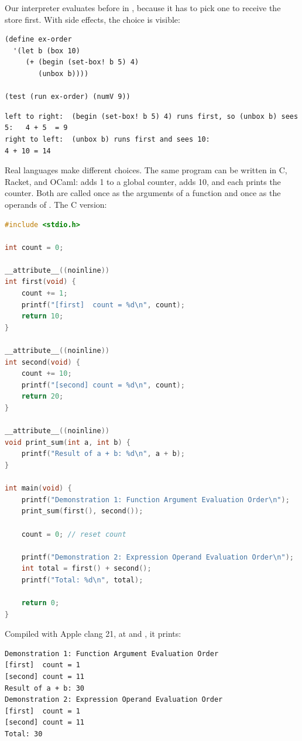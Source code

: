 Our interpreter evaluates  before  in , because it has to pick one to receive the store first. With side effects, the choice is visible:
\begin{lstlisting}
(define ex-order
  '(let b (box 10)
     (+ (begin (set-box! b 5) 4)
        (unbox b))))

(test (run ex-order) (numV 9))
\end{lstlisting}
\begin{lstlisting}[style=repl]
left to right:  (begin (set-box! b 5) 4) runs first, so (unbox b) sees 5:   4 + 5  = 9
right to left:  (unbox b) runs first and sees 10:                           4 + 10 = 14
\end{lstlisting}
Real languages make different choices. The same program can be written in C, Racket, and OCaml:  adds 1 to a global counter,  adds 10, and each prints the counter. Both are called once as the arguments of a function and once as the operands of \code{+}. The C version:
\begin{lstlisting}[language=C]
#include <stdio.h>

int count = 0;

__attribute__((noinline))
int first(void) {
    count += 1;
    printf("[first]  count = %d\n", count);
    return 10;
}

__attribute__((noinline))
int second(void) {
    count += 10;
    printf("[second] count = %d\n", count);
    return 20;
}

__attribute__((noinline))
void print_sum(int a, int b) {
    printf("Result of a + b: %d\n", a + b);
}

int main(void) {
    printf("Demonstration 1: Function Argument Evaluation Order\n");
    print_sum(first(), second());

    count = 0; // reset count

    printf("Demonstration 2: Expression Operand Evaluation Order\n");
    int total = first() + second();
    printf("Total: %d\n", total);

    return 0;
}
\end{lstlisting}
Compiled with Apple clang 21, at  and , it prints:
\begin{lstlisting}[style=repl]
Demonstration 1: Function Argument Evaluation Order
[first]  count = 1
[second] count = 11
Result of a + b: 30
Demonstration 2: Expression Operand Evaluation Order
[first]  count = 1
[second] count = 11
Total: 30
\end{lstlisting}
